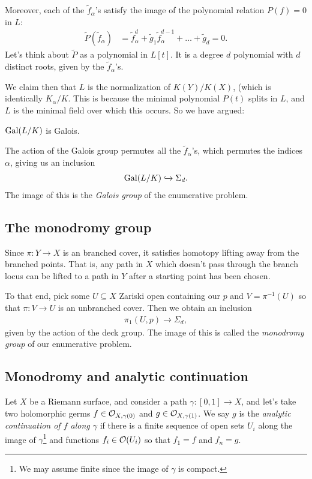 \documentclass[11pt]{amsart}
\let\til\widetilde
\begin{document}
%
Moreover, each of the $\til{f}_\alpha$'s satisfy the image of the polynomial relation $P(f) = 0$ in $L$:
\begin{align*}
    \til{P}(\til{f}_\alpha) &= \til{f}_\alpha^d + \til{g}_1 \til{f}_\alpha^{d-1} + \ldots + \til{g}_d = 0.
\end{align*}
%
Let's think about $\til{P}$ as a polynomial in $L[t]$. It is a degree $d$ polynomial with $d$ distinct roots, given by the $\til{f}_\alpha$'s.

We claim then that $L$ is the normalization of $K(Y)/K(X)$, (which is identically $K_\alpha/K$. This is because the minimal polynomial $P(t)$ splits in $L$, and $L$ is the minimal field over which this occurs. So we have argued:

\begin{proposition} $\mathrm{Gal}(L/K)$ is Galois.
\end{proposition}

The action of the Galois group permutes all the $\til{f}_\alpha$'s, which permutes the indices $\alpha$, giving us an inclusion
\begin{align*}
    \mathrm{Gal}(L/K) \xhookrightarrow{} \Sigma_d.
\end{align*}
The image of this is the \textit{Galois group} of the enumerative problem.

\subsection{The monodromy group}

Since $\pi \colon Y \to X$ is an branched cover, it satisfies homotopy lifting away from the branched points. That is, any path in $X$ which doesn't pass through the branch locus can be lifted to a path in $Y$ after a starting point has been chosen.

To that end, pick some $U \subseteq X$ Zariski open containing our $p$ and $V = \pi^{-1}(U)$ so that $\pi \colon V \to U$ is an unbranched cover. Then we obtain an inclusion
\begin{align*}
    \pi_1(U,p) \to \Sigma_d,
\end{align*}
given by the action of the deck group. The image of this is called the \textit{monodromy group} of our enumerative problem.

\subsection{Monodromy and analytic continuation}

Let $X$ be a Riemann surface, and consider a path $\gamma \colon [0,1] \to X$, and let's take two holomorphic germs $f\in \mathcal{O}_{X,\gamma(0)}$ and $g \in \mathcal{O}_{X,\gamma(1)}$. We say $g$ is the \textit{analytic continuation of $f$ along $\gamma$} if there is a finite sequence of open sets $U_i$ along the image of $\gamma$\footnote{We may assume finite since the image of $\gamma$ is compact.} and functions $f_i \in \mathcal{O}(U_i)$ so that $f_1 = f$ and $f_n = g$.
\end{document}
